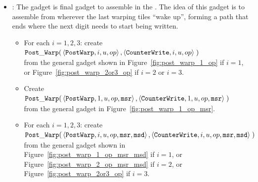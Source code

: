 \begin{itemize}
        \item {\postwarp}: The {\postwarp} gadget is final gadget to assemble in the {\warpunit}. The idea of this
        gadget is to assemble from wherever the last warping tiles ``wake up'', forming a path that ends where the
        next digit needs to start being written.

        \begin{itemize}
           \item For each $i = 1,2,3$: create\\
            $\begin{aligned}[t]
                \postwarp(& \left \langle {\tt PostWarp},     i, u, \inc \right\rangle,    %
                            \left \langle {\tt CounterWrite}, i, u, \inc \right\rangle \;) %
            \end{aligned}$ \\
            from the general gadget shown in Figure~\ref{fig:post_warp_1_op} if $i = 1$,
            or Figure~\ref{fig:post_warp_2or3_op} if $ i = 2$ or $i = 3$.
            \vspace{.5cm}


            \item Create
            $\begin{aligned}[t]
                \postwarp(& \left \langle {\tt PostWarp},     1, u, \inc, {\tt msr} \right\rangle,    %
                            \left \langle {\tt CounterWrite}, 1, u, \inc, {\tt msr} \right\rangle \;) %
            \end{aligned}$ \\
            from the general gadget in Figure~\ref{fig:post_warp_1_op_msr}.
            \vspace{.5cm}

            \item For each $i=1,2,3$: create\\
            $\begin{aligned}[t]
                \postwarp(& \left \langle {\tt PostWarp},     i, u, \inc, {\tt msr}, {\tt msd} \right\rangle,    %
                            \left \langle {\tt CounterWrite}, i, u, \inc, {\tt msr}, {\tt msd} \right\rangle \;) %
            \end{aligned}$ \\
            from the general gadget shown in Figure~\ref{fig:post_warp_1_op_msr_msd} if $i = 1$, or
            Figure~\ref{fig:post_warp_2_op_msr_msd} if $i = 2$, or Figure~\ref{fig:post_warp_2or3_op} if $i = 3$.
            \vspace{.5cm}


\end{itemize}
\end{itemize}

